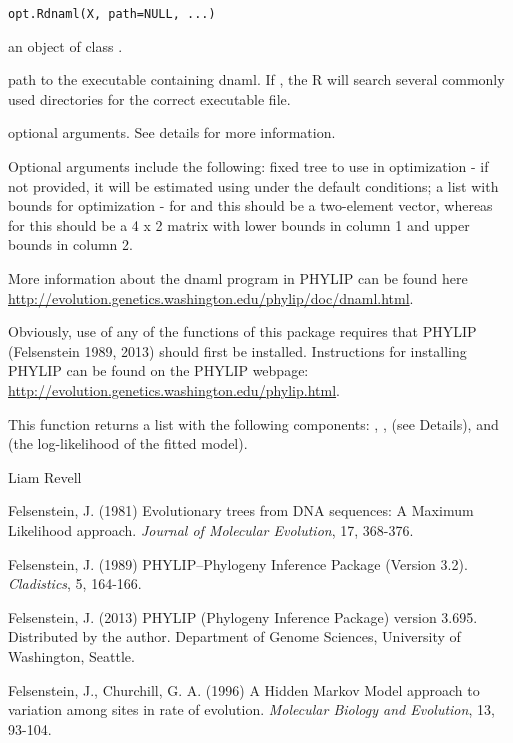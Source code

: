 \documentclass[a4paper]{book}
\begin{document}
%
\begin{Usage}
\begin{verbatim}
opt.Rdnaml(X, path=NULL, ...)
\end{verbatim}
\end{Usage}
%
\begin{Arguments}
\begin{ldescription}
\item[\code{X}] an object of class .
\item[\code{path}] path to the executable containing dnaml. If , the R will search several commonly used directories for the correct executable file.
\item[\code{...}] optional arguments. See details for more information.
\end{ldescription}
\end{Arguments}
%
\begin{Details}\relax
Optional arguments include the following:  fixed tree to use in optimization - if not provided, it will be estimated using  under the default conditions;  a list with bounds for optimization - for  and  this should be a two-element vector, whereas for  this should be a 4 x 2 matrix with lower bounds in column 1 and upper bounds in column 2.

More information about the dnaml program in PHYLIP can be found here \url{http://evolution.genetics.washington.edu/phylip/doc/dnaml.html}.

Obviously, use of any of the functions of this package requires that PHYLIP (Felsenstein 1989, 2013) should first be installed. Instructions for installing PHYLIP can be found on the PHYLIP webpage: \url{http://evolution.genetics.washington.edu/phylip.html}.
\end{Details}
%
\begin{Value}
This function returns a list with the following components: , ,  (see Details), and  (the log-likelihood of the fitted model).
\end{Value}
%
\begin{Author}\relax
Liam Revell 
\end{Author}
%
\begin{References}\relax
Felsenstein, J. (1981) Evolutionary trees from DNA sequences: A Maximum Likelihood approach. \emph{Journal of Molecular Evolution}, 17, 368-376.

Felsenstein, J. (1989) PHYLIP--Phylogeny Inference Package (Version 3.2). \emph{Cladistics}, 5, 164-166.

Felsenstein, J. (2013) PHYLIP (Phylogeny Inference Package) version 3.695. Distributed by the author. Department of Genome Sciences, University of Washington, Seattle.

Felsenstein, J., Churchill, G. A. (1996) A Hidden Markov Model approach to variation among sites in rate of evolution. \emph{Molecular Biology and Evolution}, 13, 93-104.
\end{References}
\end{document}
